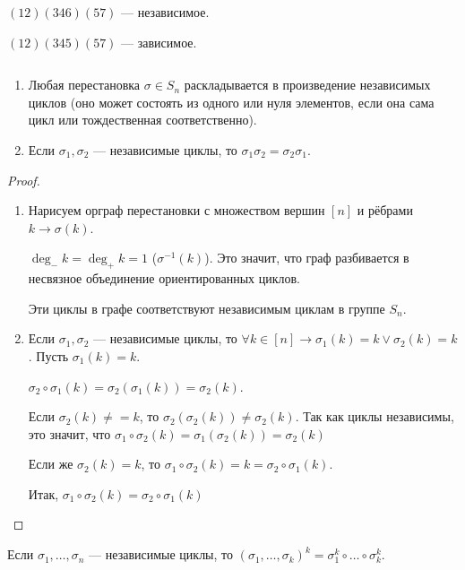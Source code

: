 \begin{example} $ $

  $(12) (346) (57)$ --- независимое.

  $(12) (345) (57)$ --- зависимое.
\end{example}

\begin{claim}$ $
  \begin{enumerate}
	\item Любая перестановка $\sigma \in S_n$ раскладывается в произведение независимых циклов (оно может состоять из одного или нуля элементов,
	  если она сама цикл или тождественная соответственно).

	\item Если $\sigma_1, \sigma_2$ --- независимые циклы, то $\sigma_1\sigma_2 = \sigma_2\sigma_1$.
  \end{enumerate}

  \begin{proof} $ $

	\begin{enumerate}
	  \item Нарисуем орграф перестановки с множеством вершин $[n]$ и рёбрами $k \to \sigma(k)$.

		$\deg_-k = \deg_+k = 1$ ($\sigma^{-1}(k)$). Это значит, что граф разбивается в несвязное объединение ориентированных циклов.

		Эти циклы в графе соответствуют независимым циклам в группе $S_n$.

	  \item Если $\sigma_1, \sigma_2$ --- независимые циклы, то $\forall k \in [n] \to \sigma_1(k) = k \lor \sigma_2(k) = k$.
		Пусть $\sigma_1(k) = k$.

		$\sigma_2\circ \sigma_1(k) = \sigma_2(\sigma_1(k)) = \sigma_2(k)$. 

		Если $\sigma_2(k) \neq =k$, то $\sigma_2(\sigma_2(k)) \neq \sigma_2(k)$. Так как циклы независимы, 
		это значит, что $\sigma_1 \circ \sigma_2(k) = \sigma_1(\sigma_2(k)) = \sigma_2(k)$

		Если же $\sigma_2(k) = k$, то $\sigma_1 \circ \sigma_2(k) = k = \sigma_2 \circ \sigma_1(k)$.

		Итак, $\sigma_1 \circ \sigma_2 (k) = \sigma_2 \circ \sigma_1 (k)$
	\end{enumerate}
  \end{proof}
\end{claim}

\begin{claim}
  Если $\sigma_1, \ldots, \sigma_n$ --- независимые циклы, то $(\sigma_1, \ldots, \sigma_k)^k = \sigma_1^k \circ \ldots \circ \sigma_k^k$.
\end{claim}

